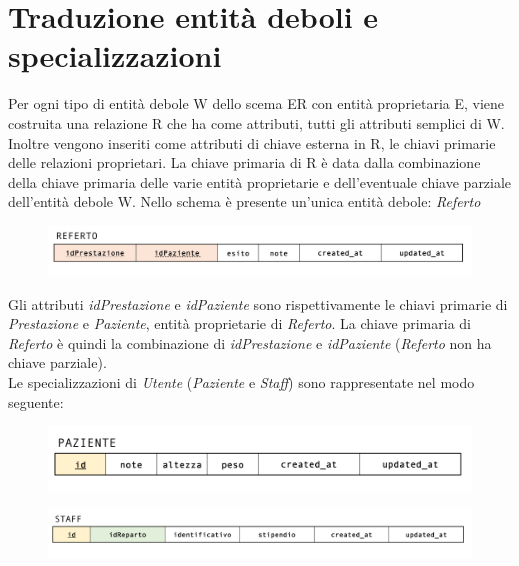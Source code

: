 \documentclass[paper=a4, fontsize=11pt,x11names]{report}
\begin{document}
\section{Traduzione entità deboli e specializzazioni}
Per ogni tipo di entità debole W dello scema ER con entità proprietaria E, viene costruita una relazione R che ha come attributi, tutti gli attributi semplici di W. Inoltre vengono inseriti come attributi di chiave esterna in R, le chiavi primarie delle relazioni proprietari. La chiave primaria di R è data dalla combinazione della chiave primaria delle varie entità proprietarie e dell'eventuale chiave parziale dell'entità debole W.
Nello schema è presente un'unica entità debole: \textit{Referto}
\begin{figure}[H]
\begin{center}
\includegraphics[scale=0.3]{refertoSchema}
\end{center}
\end{figure}
Gli attributi \textit{idPrestazione} e \textit{idPaziente} sono rispettivamente le chiavi primarie di \textit{Prestazione} e \textit{Paziente}, entità proprietarie di \textit{Referto}. La chiave primaria di \textit{Referto} è quindi la combinazione di \textit{idPrestazione} e \textit{idPaziente} (\textit{Referto} non ha chiave parziale).\\

Le specializzazioni di \textit{Utente} (\textit{Paziente} e \textit{Staff}) sono rappresentate nel modo seguente:
\begin{figure}[H]
\begin{center}
\includegraphics[scale=0.3]{pazienteSchema}
\end{center}
\end{figure}

\begin{figure}[H]
\begin{center}
\includegraphics[scale=0.3]{staffSchema}
\end{center}
\end{figure}
\end{document}
